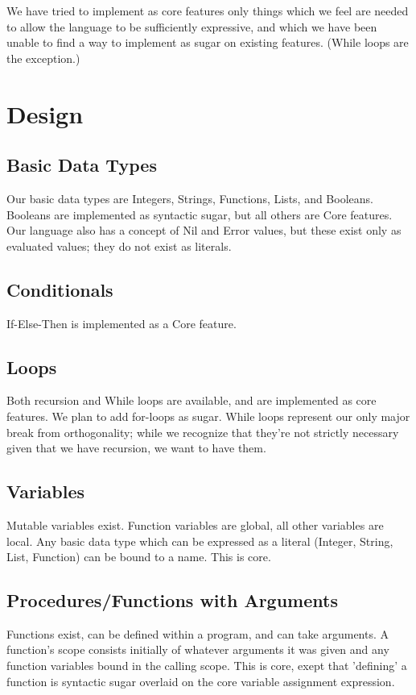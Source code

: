 \documentclass{article}
\begin{document}
We have tried to implement as core features only things which we feel are needed to allow the language to be sufficiently expressive, and which we have been unable to find a way to implement as sugar on existing features.  (While loops are the exception.)

\section*{Design}

\subsection*{Basic Data Types}
Our basic data types are Integers, Strings, Functions, Lists, and Booleans.  Booleans are implemented as syntactic sugar, but all others are Core features.  Our language also has a concept of Nil and Error values, but these exist only as evaluated values; they do not exist as literals.

\subsection*{Conditionals}
If-Else-Then is implemented as a Core feature.

\subsection*{Loops}
Both recursion and While loops are available, and are implemented as core features.  We plan to add for-loops as sugar.  While loops represent our only major break from orthogonality; while we recognize that they're not strictly necessary given that we have recursion, we want to have them.

\subsection*{Variables}
Mutable variables exist.  Function variables are global, all other variables are local.  Any basic data type which can be expressed as a literal (Integer, String, List, Function) can be bound to a name.  This is core.

\subsection*{Procedures/Functions with Arguments}
Functions exist, can be defined within a program, and can take arguments.  A function's scope consists initially of whatever arguments it was given and any function variables bound in the calling scope.  This is core, exept that 'defining' a function is syntactic sugar overlaid on the core variable assignment expression.
\end{document}
